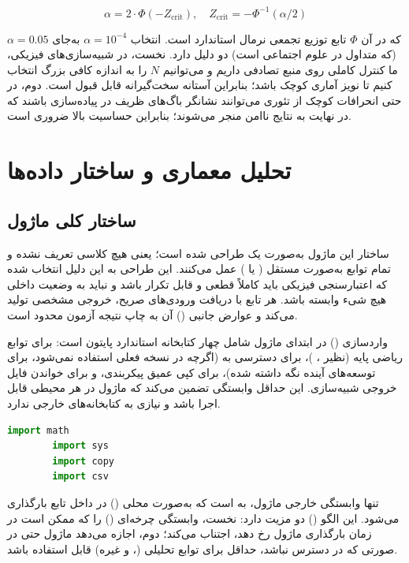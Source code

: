 \begin{equation}
	\alpha = 2 \cdot \Phi(-Z_{\text{crit}}), \quad Z_{\text{crit}} = -\Phi^{-1}(\alpha/2)
\end{equation}

که در آن $\Phi$ تابع توزیع تجمعی نرمال استاندارد است. انتخاب $\alpha = 10^{-4}$ به‌جای $\alpha = 0.05$ (که متداول در علوم اجتماعی است) دو دلیل دارد. نخست، در شبیه‌سازی‌های فیزیکی، ما کنترل کاملی روی منبع تصادفی داریم و می‌توانیم $N$ را به اندازه کافی بزرگ انتخاب کنیم تا نویز آماری کوچک باشد؛ بنابراین آستانه سخت‌گیرانه قابل قبول است. دوم، در  حتی انحرافات کوچک از تئوری می‌توانند نشانگر باگ‌های ظریف در پیاده‌سازی باشند که در نهایت به نتایج ناامن منجر می‌شوند؛ بنابراین حساسیت بالا ضروری است.

\section{تحلیل معماری و ساختار داده‌ها}

\subsection{ساختار کلی ماژول}

ساختار این ماژول به‌صورت یک  طراحی شده است؛ یعنی هیچ کلاسی تعریف نشده و تمام توابع به‌صورت مستقل ( یا ) عمل می‌کنند. این طراحی به این دلیل انتخاب شده که اعتبارسنجی فیزیکی باید کاملاً قطعی و قابل تکرار باشد و نباید به وضعیت داخلی هیچ شیء وابسته باشد. هر تابع با دریافت ورودی‌های صریح، خروجی مشخصی تولید می‌کند و عوارض جانبی () آن به چاپ نتیجه آزمون محدود است.

واردسازی () در ابتدای ماژول شامل چهار کتابخانه استاندارد پایتون است:  برای توابع ریاضی پایه (نظیر ، )،  برای دسترسی به  (اگرچه در نسخه فعلی استفاده نمی‌شود، برای توسعه‌های آینده نگه داشته شده)،  برای کپی عمیق پیکربندی، و  برای خواندن فایل خروجی شبیه‌سازی. این حداقل وابستگی تضمین می‌کند که ماژول در هر محیطی قابل اجرا باشد و نیازی به کتابخانه‌های خارجی ندارد.

\begin{LTR}
	\begin{lstlisting}[language=Python]
		import math
		import sys
		import copy
		import csv
	\end{lstlisting}
\end{LTR}

تنها وابستگی خارجی ماژول، به  است که به‌صورت محلی () در داخل تابع  بارگذاری می‌شود. این الگو () دو مزیت دارد: نخست، وابستگی چرخه‌ای () را که ممکن است در زمان بارگذاری ماژول رخ دهد، اجتناب می‌کند؛ دوم، اجازه می‌دهد ماژول حتی در صورتی که  در دسترس نباشد، حداقل برای توابع تحلیلی (،  و غیره) قابل استفاده باشد.

